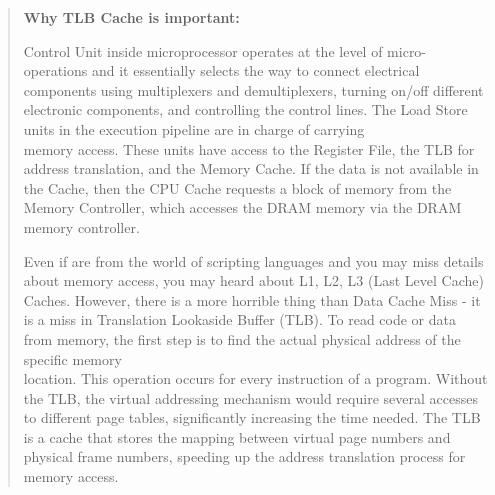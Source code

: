 \documentclass[
]{article}
\begin{document}
\begin{quote}
\textbf{Why TLB Cache is important:}

Control Unit inside microprocessor operates at the level of
micro-operations and it essentially selects the way to connect
electrical components using multiplexers and demultiplexers, turning
on/off different electronic components, and controlling the control
lines. The Load Store units in the execution pipeline are in charge of
carrying \\
memory access. These units have access to the Register File, the TLB for
address translation, and the Memory Cache. If the data is not available
in the Cache, then the CPU Cache requests a block of memory from the
Memory Controller, which accesses the DRAM memory via the DRAM memory
controller.

Even if are from the world of scripting languages and you may miss
details about memory access, you may heard about L1, L2, L3 (Last Level
Cache) Caches. However, there is a more horrible thing than Data Cache
Miss - it is a miss in Translation Lookaside Buffer (TLB). To read code
or data from memory, the first step is to find the actual physical
address of the specific memory\\
location. This operation occurs for every instruction of a program.
Without the TLB, the virtual addressing mechanism would require several
accesses to different page tables, significantly increasing the time
needed. The TLB is a cache that stores the mapping between virtual page
numbers and physical frame numbers, speeding up the address translation
process for memory access.
\end{quote}
\end{document}
